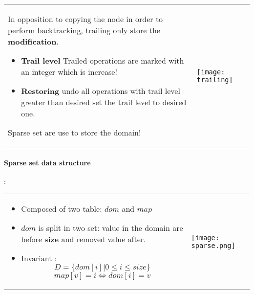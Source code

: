 \begin{tabular}{m{10cm}m{6cm}}
    In opposition to copying the node in order to perform backtracking,
    trailing only store the \textbf{modification}.

    \begin{itemize}
        \item \textbf{Trail level}
            Trailed operations are marked with an integer which is increase!

        \item \textbf{Restoring} undo all operations with trail level greater than
            desired set the trail level to desired one.
    \end{itemize}

    Sparse set are use to store the domain!
    &
    \texttt{[image: trailing]}
\end{tabular}

\paragraph{Sparse set data structure}:


\begin{tabular}{m{7cm}m{1.5cm}}
\begin{itemize}
        \item Composed of two table: $dom$ and $map$
        \item $dom$ is split in two set: value in the domain
            are before \textbf{size} and removed value after.

        \item \textbf{}{Invariant} :
            $$ D = \{dom[i] | 0 \leq i \leq size\}$$
            $$map[v] = i \Leftrightarrow dom[i] = v$$
    \end{itemize}
&
\texttt{[image: sparse.png]}
\end{tabular}


